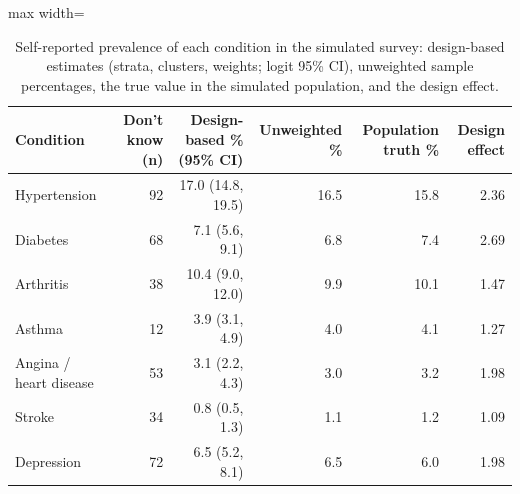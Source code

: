 \begin{table}[htbp]

\caption{\label{tab:tab_condition_prevalence}Self-reported prevalence of each condition in the simulated survey: design-based estimates (strata, clusters, weights; logit 95\% CI), unweighted sample percentages, the true value in the simulated population, and the design effect.}
\centering
\small
\begin{adjustbox}{max width=\linewidth}
\begin{tabular}{lrrrrr}
\toprule
Condition & Don't know (n) & Design-based \% (95\% CI) & Unweighted \% & Population truth \% & Design effect\\
\midrule
Hypertension & 92 & 17.0 (14.8, 19.5) & 16.5 & 15.8 & 2.36\\
Diabetes & 68 & 7.1 (5.6, 9.1) & 6.8 & 7.4 & 2.69\\
Arthritis & 38 & 10.4 (9.0, 12.0) & 9.9 & 10.1 & 1.47\\
Asthma & 12 & 3.9 (3.1, 4.9) & 4.0 & 4.1 & 1.27\\
Angina / heart disease & 53 & 3.1 (2.2, 4.3) & 3.0 & 3.2 & 1.98\\
Stroke & 34 & 0.8 (0.5, 1.3) & 1.1 & 1.2 & 1.09\\
Depression & 72 & 6.5 (5.2, 8.1) & 6.5 & 6.0 & 1.98\\
\bottomrule
\end{tabular}
\end{adjustbox}
\end{table}
